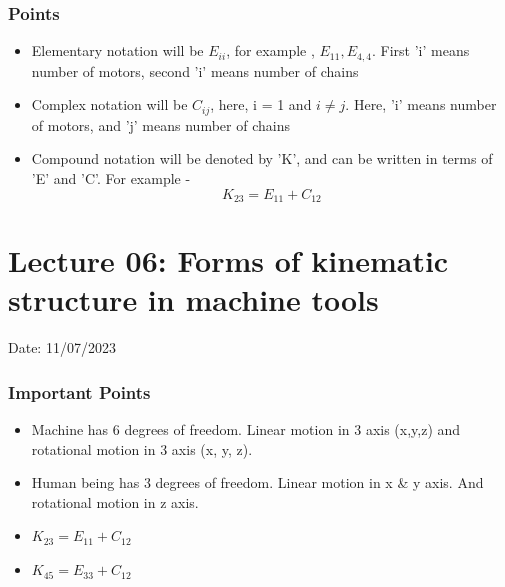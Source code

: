 \documentclass{article}
\begin{document}
\subsubsection*{Points}
\begin{itemize}
  \item Elementary notation will be $E_{ii}$, for example , $E_{11}, E_{4,4}$. First 'i' means number of motors, second 'i' means number of chains 
  \item Complex notation will be $C_{ij}$, here, i = 1 and $i \neq j$. Here, 'i' means number of motors, and 'j' means number of chains 
  \item Compound notation will be denoted by 'K', and can be written in terms of 'E' and 'C'. For example - 
  $$K_{23} = E_{11} + C_{12}$$
\end{itemize}
\hrulefill

\section{Lecture 06: Forms of kinematic structure in machine tools} 
\hfill Date: 11/07/2023

\subsubsection*{Important Points}
\begin{itemize}
  \item Machine has 6 degrees of freedom. Linear motion in 3 axis (x,y,z) and rotational motion in 3 axis (x, y, z). 
  \item Human being has 3 degrees of freedom. Linear motion in x \& y axis. And rotational motion in z axis. 
  \item $K_{23} = E_{11} + C_{12}$ 
  \item $K_{45} = E_{33} + C_{12}$ 
\end{itemize}
\end{document}
